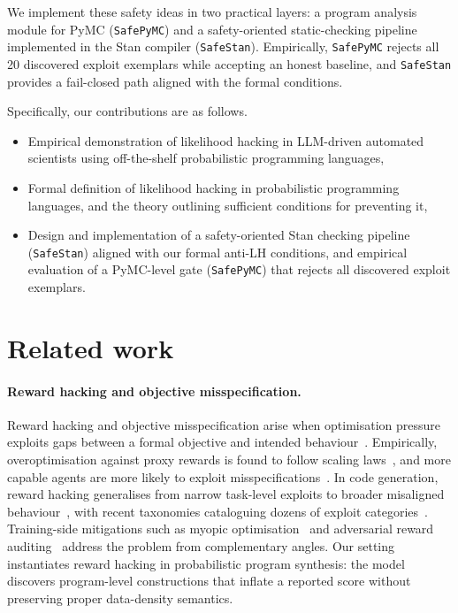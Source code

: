 \documentclass[preprint]{uai2026} %
\begin{document}
We implement these safety ideas in two practical layers: a program analysis module for PyMC (\texttt{SafePyMC}) and a safety-oriented static-checking pipeline implemented in the Stan compiler (\texttt{SafeStan}). Empirically, \texttt{SafePyMC} rejects all 20 discovered exploit exemplars while accepting an honest baseline, and \texttt{SafeStan} provides a fail-closed path aligned with the formal conditions.

Specifically, our contributions are as follows.
\begin{itemize}[left=0pt,nosep]
    \item Empirical demonstration of likelihood hacking in LLM-driven automated scientists using off-the-shelf probabilistic programming languages,
    \item Formal definition of likelihood hacking in probabilistic programming languages, and the theory outlining sufficient conditions for preventing it,
    \item Design and implementation of a safety-oriented Stan checking pipeline (\texttt{SafeStan}) aligned with our formal anti-LH conditions, and empirical evaluation of a PyMC-level gate (\texttt{SafePyMC}) that rejects all discovered exploit exemplars.
\end{itemize}
\section{Related work}

\paragraph{Reward hacking and objective misspecification.}
Reward hacking and objective misspecification arise when optimisation pressure exploits gaps between a formal objective and intended behaviour~\citep{manheimCategorizingVariantsGoodharts2019,hubingerRisksLearnedOptimization2021,skalseDefiningCharacterizingReward2022,karwowskiGoodhartsLawReinforcement2023a}. Empirically, overoptimisation against proxy rewards is found to follow scaling laws~\citep{gaoScalingLawsReward2023a,rafailovScalingLawsReward2024}, and more capable agents are more likely to exploit misspecifications~\citep{panEffectsRewardMisspecification2022}.
%
In code generation, reward hacking generalises from narrow task-level exploits to broader misaligned behaviour~\citep{taylorSchoolRewardHacks2025}, with recent taxonomies cataloguing dozens of exploit categories~\citep{deshpandeBenchmarkingRewardHack2026}.
Training-side mitigations such as myopic optimisation~\citep{farquharMONAMyopicOptimization2025} and adversarial reward auditing~\citep{beigiAdversarialRewardAuditing2026} address the problem from complementary angles. Our setting instantiates reward hacking in probabilistic program synthesis: the model discovers program-level constructions that inflate a reported score without preserving proper data-density semantics.
\end{document}
